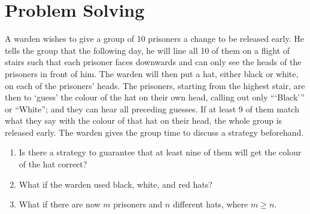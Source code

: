 \section{Problem Solving}

\begin{problem}
    A warden wishes to give a group of 10 prisoners a change to be released early. He tells the group that the following day, he will line all 10 of them on a flight of stairs such that each prisoner faces downwards and can only see the heads of the prisoners in front of him. The warden will then put a hat, either black or white, on each of the prisoners' heads. The prisoners, starting from the highest stair, are then to `guess' the colour of the hat on their own head, calling out only ```Black''' or ``White''; and they can hear all preceding guesses. If at least 9 of them match what they say with the colour of that hat on their head, the whole group is released early. The warden gives the group time to discuss a strategy beforehand.

    \begin{enumerate}
        \item Is there a strategy to guarantee that at least nine of them will get the colour of the hat correct?
        \item What if the warden used black, white, and red hats?
        \item What if there are now $m$ prisoners and $n$ different hats, where $m \geq n$.
    \end{enumerate}
\end{problem}

